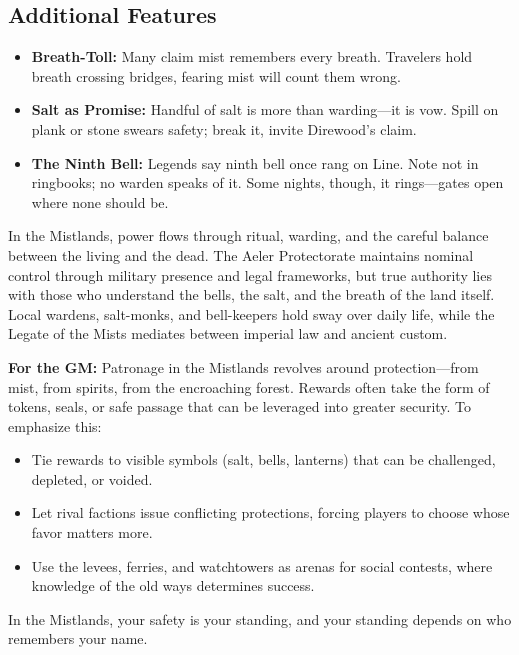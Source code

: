 \subsection*{Additional Features}
\begin{itemize}
\item \textbf{Breath-Toll:} Many claim mist remembers every breath. Travelers hold breath crossing bridges, fearing mist will count them wrong.
\item \textbf{Salt as Promise:} Handful of salt is more than warding---it is vow. Spill on plank or stone swears safety; break it, invite Direwood's claim.
\item \textbf{The Ninth Bell:} Legends say ninth bell once rang on Line. Note not in ringbooks; no warden speaks of it. Some nights, though, it rings---gates open where none should be.
\end{itemize}

\begin{tcolorbox}[colback=black!3,colframe=black!40!white,title={Patronage \& Power}]
In the Mistlands, power flows through ritual, warding, and the careful balance between the living and the dead. The Aeler Protectorate maintains nominal control through military presence and legal frameworks, but true authority lies with those who understand the bells, the salt, and the breath of the land itself. Local wardens, salt-monks, and bell-keepers hold sway over daily life, while the Legate of the Mists mediates between imperial law and ancient custom.

\textbf{For the GM:}  
Patronage in the Mistlands revolves around protection---from mist, from spirits, from the encroaching forest. Rewards often take the form of tokens, seals, or safe passage that can be leveraged into greater security. To emphasize this:
\begin{itemize}
\item Tie rewards to visible symbols (salt, bells, lanterns) that can be challenged, depleted, or voided.
\item Let rival factions issue conflicting protections, forcing players to choose whose favor matters more.
\item Use the levees, ferries, and watchtowers as arenas for social contests, where knowledge of the old ways determines success.
\end{itemize}
In the Mistlands, your safety is your standing, and your standing depends on who remembers your name.
\end{tcolorbox}

